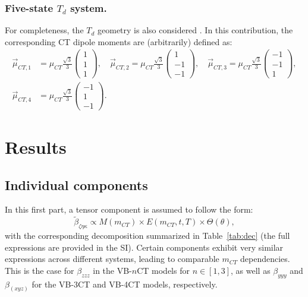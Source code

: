 \documentclass[USenglish]{article}
\begin{document}
\subsubsection{Five-state $T_d$ system.}  
For completeness, the $T_d$ geometry is also considered \cite{choNonlinearOpticalProperties2002}. In this contribution, the corresponding CT dipole moments are (arbitrarily) defined as:  
\begin{align*}
	\vec{\mu}_{CT,1} &= \mu_{CT} \frac{\sqrt{3}}{3} \begin{pmatrix} 1 \\ 1 \\ 1 \end{pmatrix},  
	\quad  
	\vec{\mu}_{CT,2} = \mu_{CT} \frac{\sqrt{3}}{3} \begin{pmatrix} 1 \\ -1 \\ -1 \end{pmatrix}, 
	\quad
	 \vec{\mu}_{CT,3} = \mu_{CT} \frac{\sqrt{3}}{3} \begin{pmatrix} -1 \\ -1 \\ 1 \end{pmatrix},  \\
	\vec{\mu}_{CT,4} &= \mu_{CT} \frac{\sqrt{3}}{3} \begin{pmatrix} -1 \\ 1 \\ -1 \end{pmatrix}.
\end{align*}

\section{Results}

\subsection{Individual components}

In this first part, a tensor component is assumed to follow the form:
\begin{equation*}
	\tilde \beta_{\zeta\eta\kappa} \propto M(m_{CT}) \times E(m_{CT},t,T) \times \Theta(\theta),
\end{equation*}
with the corresponding decomposition summarized in Table~\ref{tab:dec} (the full expressions are provided in the SI).
Certain components exhibit very similar expressions across different systems, leading to comparable $m_{CT}$ dependencies. This is the case for $\beta_{zzz}$ in the VB-$n$CT models for $n\in[1,3]$, as well as $\beta_{yyy}$ and $\beta_{(xyz)}$ for the VB-3CT and VB-4CT models, respectively. 
\end{document}
